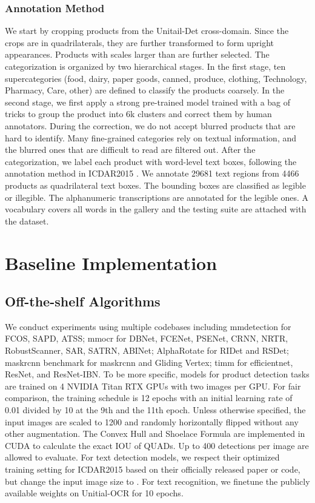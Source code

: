 \documentclass[runningheads]{llncs}
\begin{document}
\subsubsection{Annotation Method}
We start by cropping products from the Unitail-Det cross-domain. Since the crops are in quadrilaterals, they are further transformed to form upright appearances. Products with scales larger than  are further selected. The categorization is organized by two hierarchical stages. In the first stage, ten supercategories (food, dairy, paper goods, canned, produce, clothing, Technology, Pharmacy, Care, other) are defined to classify the products coarsely. In the second stage, we first apply a strong pre-trained model trained with a bag of tricks to group the product into 6k clusters and correct them by human annotators. During the correction, we do not accept blurred products that are hard to identify. Many fine-grained categories rely on textual information, and the blurred ones that 
are difficult to read are filtered out. After the categorization, we label each product with word-level text boxes, following the annotation method in ICDAR2015 \cite{ICDAR15}. We annotate 29681 text regions from 4466 products as quadrilateral text boxes. The bounding boxes are classified as legible or illegible. The alphanumeric transcriptions  are annotated for the legible ones. A vocabulary covers all words in the gallery and the testing suite are attached with the dataset.

\section{Baseline Implementation}
\subsection{Off-the-shelf Algorithms}
We conduct experiments using multiple codebases including mmdetection \cite{mmdetection} for FCOS, SAPD, ATSS; mmocr \cite{mmocr2021} for DBNet, FCENet, PSENet, CRNN, NRTR, RobustScanner, SAR, SATRN, ABINet; AlphaRotate \cite{yang2021alpharotate} for RIDet and RSDet; maskrcnn benchmark\cite{massa2018maskrcnn_benchmark} for maskrcnn and Gliding Vertex; timm \cite{rw2019timm} for efficientnet, ResNet, and ResNet-IBN. To be more specific, models for product detection tasks are trained on 4 NVIDIA Titan RTX GPUs with two images per GPU. For fair comparison, the training schedule is 12 epochs with an initial learning rate of 0.01 divided by 10 at the 9th and the 11th epoch. Unless otherwise specified, the input images are scaled to 1200 and randomly horizontally flipped without any other augmentation. The Convex Hull and Shoelace Formula are implemented in CUDA to calculate the exact IOU of QUADs. Up to 400 detections per image are allowed to evaluate. For text detection models, we respect their optimized training setting for ICDAR2015 based on their officially released paper or code, but change the input image size to . For text recognition, we finetune the publicly available weights on Unitial-OCR for 10 epochs.
\end{document}
